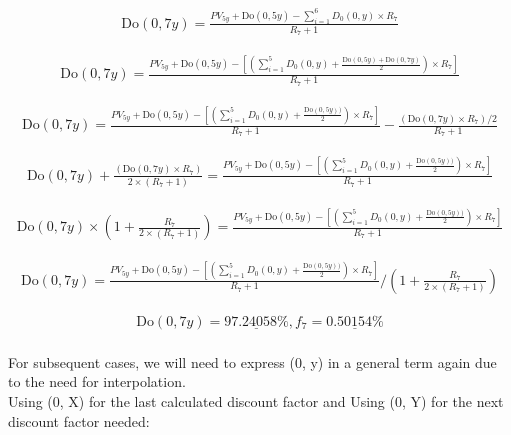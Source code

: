 \documentclass[12pt]{article}
\begin{document}
\begin{gather*}
\text{Do}(0, 7y) = \frac{PV_{5y}^{} + \text{Do}(0, 5y) - \sum_{i=1}^{6} D_0(0, y) \times R_7}{R_7 + 1}
\end{gather*}

\begin{gather*}
\text{Do}(0, 7y) = \frac{PV_{5y}^{} + \text{Do}(0, 5y) - \left[\left(\sum_{i=1}^{5} D_0(0, y) + \frac{\text{Do}(0, 5y) + \text{Do}(0, 7y)}{2} \right) \times R_7 \right]}{R_7 + 1}
\end{gather*}

\begin{gather*}
\text{Do}(0, 7y) = \frac{PV_{5y}^{} + \text{Do}(0, 5y) - \left[\left(\sum_{i=1}^{5} D_0(0, y) + \frac{\text{Do}(0, 5y))}{2} \right) \times R_7 \right]}{R_7 + 1} - \frac{\left( \text{Do}(0, 7y) \times R_7 \right) /2}{R_7 + 1}
\end{gather*}

\begin{gather*}
\text{Do}(0, 7y) + \frac{\left( \text{Do}(0, 7y) \times R_7 \right) }{2 \times \left( R_7 + 1 \right)}
= \frac{PV_{5y}^{} + \text{Do}(0, 5y) - \left[\left(\sum_{i=1}^{5} D_0(0, y) + \frac{\text{Do}(0, 5y))}{2} \right) \times R_7 \right]}{R_7 + 1}
\end{gather*}

\begin{gather*}
\text{Do}(0, 7y) \times \left( 1 + \frac{R_7}{2 \times \left( R_7 + 1 \right)} \right)
= \frac{PV_{5y}^{} + \text{Do}(0, 5y) - \left[\left(\sum_{i=1}^{5} D_0(0, y) + \frac{\text{Do}(0, 5y))}{2} \right) \times R_7 \right]}{R_7 + 1}
\end{gather*}

\begin{gather*}
\text{Do}(0, 7y) 
= \frac{PV_{5y}^{} + \text{Do}(0, 5y) - \left[\left(\sum_{i=1}^{5} D_0(0, y) + \frac{\text{Do}(0, 5y))}{2} \right) \times R_7 \right]}{R_7 + 1} / 
\left( 1 + \frac{R_7}{2 \times \left( R_7 + 1 \right)} \right)
\end{gather*}

\begin{gather*}
\text{Do}(0, 7y) = \underline{
97.24058\%},f_7 = \underline{0.50154\%}\\
\end{gather*}

\noindent For subsequent cases, we will need to express (0, y) in a general term again due to the need for interpolation.\\

\noindent Using (0, X) for the last calculated discount factor and Using (0, Y) for the next discount factor needed:
\end{document}
